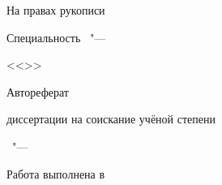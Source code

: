 \thispagestyle{empty}

\vspace{0pt plus1fill} %
\begin{flushright}
  \large{На правах рукописи}
\end{flushright}

\vspace{0pt plus3fill} %
\begin{center}
\textbf {\large \thesisAuthor}
\end{center}

\vspace{0pt plus3fill} %
\begin{center}
\textbf {\Large \thesisTitle}

\vspace{0pt plus3fill} %
{\large Специальность \thesisSpecialtyNumber\ "---\par <<\thesisSpecialtyTitle>>}

\vspace{0pt plus1.5fill} %
\Large{Автореферат}\par
\large{диссертации на соискание учёной степени\par \thesisDegree}
\end{center}

\vspace{0pt plus4fill} %
\begin{center}
{\large{\thesisCity\ "--- \thesisYear}}
\end{center}

\newpage
\thispagestyle{empty}
\noindent Работа выполнена в \thesisInOrganization

